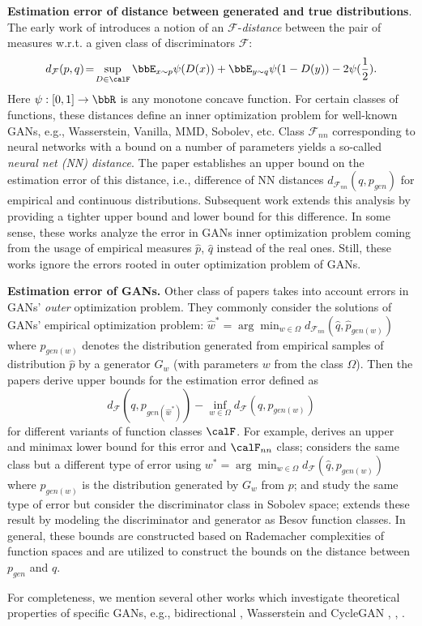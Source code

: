 \textbf{Estimation error of distance between generated and true distributions}. The early work of \citep{arora2017generalization} introduces a notion of an $\mathcal{F}$-\textit{distance}
between the pair of measures w.r.t. a given class of discriminators $\mathcal{F}$:
$$
d_{\mathcal{F}}(p,q)\!=\! \sup_{D\in \calF} \bbE_{x\sim p} \psi(D(x)) + \bbE_{y\sim q} \psi(1-D(y))-2\psi(\frac{1}{2}).
$$
Here $\psi:[0,1]\rightarrow\bbR$ is any monotone concave function.
For certain classes of functions, these distances define an inner optimization problem for well-known GANs, e.g., Wasserstein, Vanilla, MMD, Sobolev, etc. Class $\mathcal{F}_{nn}$ corresponding to neural networks with a bound on a number of parameters yields a so-called \textit{neural net (NN) distance}. 
The paper \citep{arora2017generalization} establishes an upper bound on the estimation error of this distance, i.e., difference of NN distances $d_{\mathcal{F}_{nn}}(q, p_{gen})$ for empirical and continuous distributions. Subsequent work \citep{ji2018minimax} extends this analysis by providing a tighter upper bound and lower bound for this difference. In some sense, these works analyze the error in GANs inner optimization problem coming from the usage of empirical measures $\widehat{p}$, $\widehat{q}$ instead of the real ones.
Still, these works ignore the errors rooted in outer optimization problem of GANs. 

\textbf{Estimation error of GANs.} Other class of papers takes into account errors in GANs' \textit{outer} optimization problem. They commonly consider the solutions of GANs' empirical optimization problem:
$\widehat{w}^* = \arg\min_{w\in \Omega} d_{\mathcal{F}_{nn}}(\widehat{q},\widehat{p}_{gen(w)})
$ where $\widehat{p}_{gen(w)}$ denotes the distribution generated from empirical samples of distribution $\widehat{p}$ by a generator $G_{w}$ (with parameters $w$ from the class $\Omega$). Then the papers derive upper bounds for the estimation error defined as
$$
d_{\mathcal{F}}(q, p_{gen(\widehat{w}^*)}) - \inf_{w\in \Omega} d_{\mathcal{F}}(q, p_{gen(w)})
$$
for different variants of function classes $\calF$.
For example, \citep{ji2021understanding} derives an upper and minimax lower bound for this error and $\calF_{nn}$ class; \citep{zhang2018discrimination} considers the same class but a different type of error using $w^*=\arg\min_{w\in \Omega} d_{\mathcal{F}}(\widehat{q},p_{gen(w)})$ where $p_{gen(w)}$ is the distribution generated by $G_w$ from $p$; \citep{liang2017well} and \citep{singh2018nonparametric} study the same type of error but consider the discriminator class in Sobolev space; \citep{uppal2019nonparametric} extends these result by modeling the discriminator and generator as Besov function classes. In general, these bounds are constructed based on Rademacher complexities of function spaces and are utilized to construct the bounds on the distance between $p_{gen}$ and $q$.

For completeness, we mention several other works which investigate theoretical properties of specific GANs, e.g., bidirectional \citep{liu2021non}, Wasserstein \citep{biau2021some} and CycleGAN \citep{chakrabarty2022translation}, \citep{sun2024theoretical}, \citep{moriakov2020kernel}.